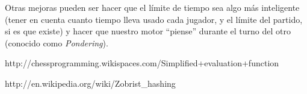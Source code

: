 \documentclass{article}
\begin{document}
Otras mejoras pueden ser hacer que el límite de tiempo sea algo más
inteligente (tener en cuenta cuanto tiempo lleva usado cada jugador,
y el límite del partido, si es que existe) y hacer que nuestro motor
``piense'' durante el turno del otro (conocido como \emph{Pondering}).
\\

\begin{thebibliography}{9}

  http://chessprogramming.wikispaces.com/Simplified+evaluation+function

  http://en.wikipedia.org/wiki/Zobrist\_hashing

\end{thebibliography}
\end{document}
